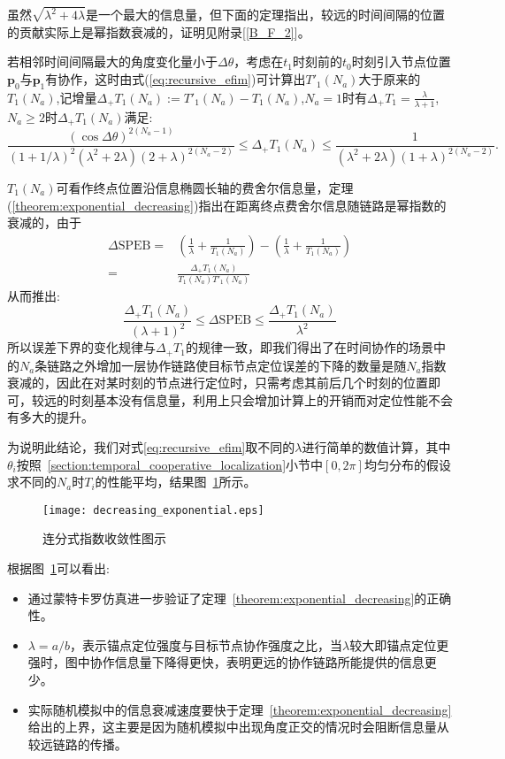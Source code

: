 虽然$\sqrt{\lambda^2+4\lambda}$是一个最大的信息量，但下面的定理指出，较远的时间间隔的位置的贡献实际上是幂指数衰减的，证明见附录[\ref{B_F_2}]。
\begin{theorem}\label{theorem:exponential_decreasing}
若相邻时间间隔最大的角度变化量小于$\Delta \theta$，考虑在$t_1$时刻前的$t_0$时刻引入节点位置$\bm{p}_0$与$\bm{p}_1$有协作，这时由式(\ref{eq:recursive_efim})可计算出$T'_1(N_a)$大于原来的$T_1(N_a)$,记增量$\Delta_+ T_1(N_a):=T'_1(N_a)-T_1(N_a)$,$N_a=1$时有$\Delta_{+} T_{1}=\frac{\lambda}{\lambda+1}$,$N_a\geq 2$时$\Delta_+ T_1(N_a)$满足:
\begin{equation}
\frac{(\cos\Delta\theta)^{2(N_a-1)}}{(1+1/\lambda)^2(\lambda^2+2\lambda)(2+\lambda)^{2(N_a-2)}}\leq \Delta_+ T_1(N_a)\leq\frac{1}{(\lambda^2+2\lambda)(1+\lambda)^{2(N_a-2)}}.
\end{equation}
\end{theorem}
\begin{remark}

$T_1(N_a)$可看作终点位置沿信息椭圆长轴的费舍尔信息量，定理(\ref{theorem:exponential_decreasing})指出在距离终点费舍尔信息随链路是幂指数的衰减的，由于
\begin{align*}
  \Delta \text{SPEB}=&(\frac{1}{\lambda}+\frac{1}{T_1(N_a)})-(\frac{1}{\lambda}+\frac{1}{T_1(N_a)})\\
  =&\frac{\Delta_+ T_1(N_a)}{T_1(N_a)T'_1(N_a)}
\end{align*}
从而推出:
\begin{equation}
\frac{\Delta_+ T_1(N_a)}{(\lambda+1)^2}\leq  \Delta \text{SPEB} \leq \frac{\Delta_+ T_1(N_a)}{\lambda^2}
\end{equation}
所以误差下界的变化规律与$\Delta_{+} T_{1}$的规律一致，即我们得出了在时间协作的场景中的$N_a$条链路之外增加一层协作链路使目标节点定位误差的下降的数量是随$N_a$指数衰减的，因此在对某时刻的节点进行定位时，只需考虑其前后几个时刻的位置即可，较远的时刻基本没有信息量，利用上只会增加计算上的开销而对定位性能不会有多大的提升。
\end{remark}


为说明此结论，我们对式\ref{eq:recursive_efim}取不同的$\lambda$进行简单的数值计算，其中$\theta_i$按照~\ref{section:temporal_cooperative_localization}小节中$[0,2\pi]$均匀分布的假设求不同的$N_a$时$T_i$的性能平均，结果图~\ref{fig:continuous_fraction_exponential}所示。
\begin{figure}
  \centering
  \texttt{[image: decreasing\_exponential.eps]}
  \caption{连分式指数收敛性图示}\label{fig:continuous_fraction_exponential}
\end{figure}
根据图~\ref{fig:continuous_fraction_exponential}可以看出:
\begin{itemize}
\item 通过蒙特卡罗仿真进一步验证了定理~\ref{theorem:exponential_decreasing}的正确性。
\item $\lambda=a/b$，表示锚点定位强度与目标节点协作强度之比，当$\lambda$较大即锚点定位更强时，图中协作信息量下降得更快，表明更远的协作链路所能提供的信息更少。
\item 实际随机模拟中的信息衰减速度要快于定理~\ref{theorem:exponential_decreasing}给出的上界，这主要是因为随机模拟中出现角度正交的情况时会阻断信息量从较远链路的传播。\end{itemize}

